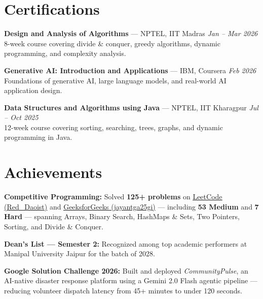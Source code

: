 \documentclass[letterpaper,11pt]{article}
\begin{document}
\section{Certifications}
\begin{itemize}[leftmargin=0.15in, itemsep=4pt]
  \small{
    \item \textbf{Design and Analysis of Algorithms} \textnormal{--- NPTEL, IIT Madras} \hfill \textit{Jan -- Mar 2026}\\[1pt]
    \textnormal{8-week course covering divide \& conquer, greedy algorithms, dynamic programming, and complexity analysis.}

    \item \textbf{Generative AI: Introduction and Applications} \textnormal{--- IBM, Coursera} \hfill \textit{Feb 2026}\\[1pt]
    \textnormal{Foundations of generative AI, large language models, and real-world AI application design.}

    \item \textbf{Data Structures and Algorithms using Java} \textnormal{--- NPTEL, IIT Kharagpur} \hfill \textit{Jul -- Oct 2025}\\[1pt]
    \textnormal{12-week course covering sorting, searching, trees, graphs, and dynamic programming in Java.}
  }
\end{itemize}
\vspace{-8pt}


\section{Achievements}
\begin{itemize}[leftmargin=0.15in, itemsep=2pt]
  \small{
    \item \textbf{Competitive Programming:} Solved \textbf{125+ problems} on
    \href{https://leetcode.com/u/Red_Daoist/}{\underline{LeetCode (Red\_Daoist)}} and
    \href{https://www.geeksforgeeks.org/profile/jayantga25gi}{\underline{GeeksforGeeks (jayantga25gi)}} ---
    including \textbf{53 Medium} and \textbf{7 Hard} --- spanning Arrays, Binary Search, HashMaps \& Sets,
    Two Pointers, Sorting, and Divide \& Conquer.

    \item \textbf{Dean's List --- Semester 2:} Recognized among top academic performers at Manipal University Jaipur for the batch of 2028.
  }
\item \textbf{Google Solution Challenge 2026:} Built and deployed \textit{CommunityPulse}, an AI-native disaster response platform using a Gemini 2.0 Flash agentic pipeline --- reducing volunteer dispatch latency from 45+ minutes to under 120 seconds.

\end{itemize}
\end{document}
